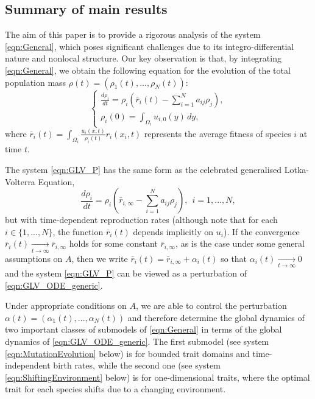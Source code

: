 \documentclass{article}
\begin{document}
\subsection{Summary of main results}

The aim of this paper is to provide a rigorous analysis of the system \eqref{eqn:General}, which poses significant challenges due to its integro-differential nature and nonlocal structure. Our key observation is that, by integrating \eqref{eqn:General}, we obtain the following equation for the evolution of the total population mass $\rho(t)=(\rho_1(t),...,\rho_N(t))$:
  \begin{equation}\label{eqn:GLV_P}
    \begin{cases}
        \frac{d\rho_i}{dt}=\rho_i\left(\bar{r}_{i}(t)-\sum_{i=1}^{N}a_{ij}\rho_j\right),\\
        \rho_i(0)=\int_{\Omega_i}u_{i,0}(y)\, dy,
    \end{cases}
\end{equation}
where $\bar{r}_i(t)=\int_{\Omega_i}\frac{u_i(x,t)}{\rho_i(t)}r_i(x_i,t)$ represents the average fitness of species $i$ at time $t$. 

The system \eqref{eqn:GLV_P} has the same form as the celebrated generalised Lotka-Volterra Equation,
\begin{equation}\label{eqn:GLV_ODE_generic}
    \frac{d\rho_i}{dt}=\rho_i\left(\bar{r}_{i,\infty}-\sum_{i=1}^Na_{ij}\rho_j\right),~~i=1,...,N,
\end{equation}
but with time-dependent reproduction rates (although note that for each $i\in\{1,...,N\}$, the function $\bar{r}_i(t)$ depends implicitly on $u_i$). If the convergence $\bar{r}_i(t)\xrightarrow[t\rightarrow\infty]{}\bar{r}_{i,\infty}$ holds for some constant $\bar{r}_{i,\infty}$, as is the case under some general assumptions on $A$, then we write $\bar{r}_i(t)=\bar{r}_{i,\infty}+\alpha_i(t)$ so that $\alpha_i(t)\xrightarrow[t\rightarrow\infty]{}0$ and the system \eqref{eqn:GLV_P} can be viewed as a perturbation of \eqref{eqn:GLV_ODE_generic}. 

Under appropriate conditions on $A$, we are able to control the perturbation $\alpha(t)=(\alpha_1(t),...,\alpha_N(t))$ and therefore determine the global dynamics of two important classes of submodels of \eqref{eqn:General} in terms of the global dynamics of \eqref{eqn:GLV_ODE_generic}. The first submodel (see system \eqref{eqn:MutationEvolution} below) is for bounded trait domains and time-independent birth rates, while the second one (see system \eqref{eqn:ShiftingEnvironment} below) is for one-dimensional traits, where the optimal trait for each species shifts due to a changing environment.
\end{document}
